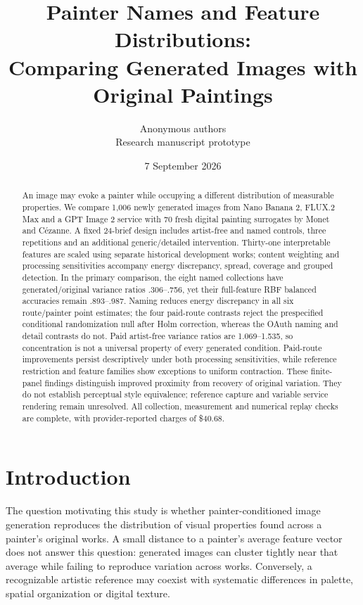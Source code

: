 \documentclass[11pt]{article}
\title{Painter Names and Feature Distributions:\\Comparing Generated Images with Original Paintings}
\author{Anonymous authors\\\small Research manuscript prototype}
\date{7 September 2026}
\begin{document}
\maketitle
\begin{abstract}
An image may evoke a painter while occupying a different distribution of
measurable properties. We compare 1,006 newly generated images from Nano Banana 2,
FLUX.2 Max and a GPT Image 2 service with 70 fresh digital painting surrogates by
Monet and Cézanne. A fixed 24-brief design includes artist-free and named controls,
three repetitions and an additional generic/detailed intervention. Thirty-one
interpretable features are scaled using separate historical development works;
content weighting and processing sensitivities accompany energy discrepancy,
spread, coverage and grouped detection. In the primary comparison, the eight
named collections have generated/original variance ratios .306--.756, yet their
full-feature RBF balanced accuracies remain .893--.987. Naming reduces energy
discrepancy in all six route/painter point estimates; the four paid-route contrasts
reject the prespecified conditional randomization null after Holm correction,
whereas the OAuth naming and detail contrasts do not. Paid artist-free
variance ratios are 1.069--1.535, so concentration is not a universal property of
every generated condition. Paid-route improvements persist descriptively under
both processing sensitivities, while reference restriction and feature families
show exceptions to uniform contraction. These finite-panel findings distinguish
improved proximity from recovery of original variation. They do not establish
perceptual style equivalence; reference capture and variable service rendering
remain unresolved. All collection, measurement and numerical replay checks are
complete, with provider-reported charges of \$40.68.
\end{abstract}

\section{Introduction}
The question motivating this study is whether painter-conditioned image
generation reproduces the distribution of visual properties found across a
painter's original works. A small distance to a painter's average feature vector
does not answer this question: generated images can cluster tightly near that
average while failing to reproduce variation across works. Conversely, a
recognizable artistic reference may coexist with systematic differences in
palette, spatial organization or digital texture.
\end{document}
